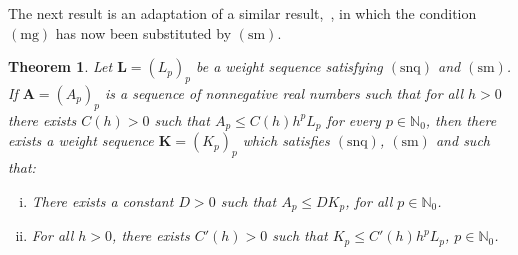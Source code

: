 \documentclass[11pt,a4paper]{article}
\theoremstyle{plain}
\newtheorem{theorem}{Theorem}[section]
\theoremstyle{definition}
\numberwithin{equation}{section}
\newcommand{\N}{\mathbb{N}}
\newcommand{\LL}{{\boldsymbol{L}}}
\newcommand{\mg}{\operatorname{(mg)}}
\newcommand{\snq}{\operatorname{(snq)}}
\newcommand{\sm}{\operatorname{(sm)}}
\begin{document}
The next result is an adaptation of a similar result,~\cite[Prop. 17]{chaucho}, in which the condition $\mg$ has now been substituted by $\sm$.

\begin{theorem}\label{theorem-Chaucho-BeurlingRoumieu} Let $\LL=(L_p)_p$ be a weight sequence satisfying $\snq$ and $\sm$.
If $\boldsymbol{A}=(A_p)_p$ is a sequence of nonnegative real numbers such that for all $h>0$ there exists $C(h)>0$ such that
$A_p\leq C(h) h^p L_p$ for every $p\in\N_0$, then there exists a weight sequence $\boldsymbol{K}=(K_p)_p$ which satisfies $\snq$, $\sm$ and such that:
\begin{enumerate}[i)]
	\item There exists a constant $D>0$ such that $A_p \leq D K_p$, for all $p\in\N_0$.
	\item For all $h>0$, there exists $C'(h)>0$ such that
	$K_p\leq C'(h) h^p L_p$, $p\in\N_0$. 	
\end{enumerate}
\end{theorem}
\end{document}
